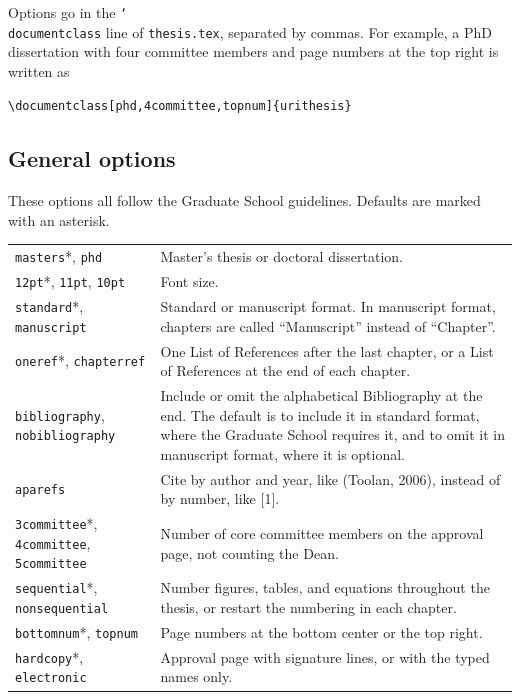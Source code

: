 \documentclass[11pt]{article}
\newcommand\cs[1]{\texttt{\char`\\#1}}
\newcommand\opt[1]{\texttt{#1}}
\newcommand\file[1]{\texttt{#1}}
\begin{document}
Options go in the \cs{documentclass} line of \file{thesis.tex}, separated by
commas.
For example, a PhD dissertation with four committee members and page numbers
at the top right is written as
\begin{verbatim}
\documentclass[phd,4committee,topnum]{urithesis}
\end{verbatim}

\subsection{General options}

These options all follow the Graduate School guidelines.
Defaults are marked with an asterisk.

\medskip
\noindent
\begin{tabularx}{\linewidth}{@{}lX@{}}
\toprule
\opt{masters}*, \opt{phd} & Master's thesis or doctoral dissertation. \\
\opt{12pt}*, \opt{11pt}, \opt{10pt} & Font size. \\
\opt{standard}*, \opt{manuscript} & Standard or manuscript format. In
  manuscript format, chapters are called ``Manuscript'' instead of
  ``Chapter''. \\
\opt{oneref}*, \opt{chapterref} & One List of References after the last
  chapter, or a List of References at the end of each chapter. \\
\opt{bibliography}, \opt{nobibliography} & Include or omit the alphabetical
  Bibliography at the end. The default is to include it in standard format,
  where the Graduate School requires it, and to omit it in manuscript format,
  where it is optional. \\
\opt{aparefs} & Cite by author and year, like (Toolan, 2006), instead of by
  number, like [1]. \\
\opt{3committee}*, \opt{4committee}, \opt{5committee} & Number of core
  committee members on the approval page, not counting the Dean. \\
\opt{sequential}*, \opt{nonsequential} & Number figures, tables, and
  equations throughout the thesis, or restart the numbering in each
  chapter. \\
\opt{bottomnum}*, \opt{topnum} & Page numbers at the bottom center or the top
  right. \\
\opt{hardcopy}*, \opt{electronic} & Approval page with signature lines, or
  with the typed names only. \\
\bottomrule
\end{tabularx}
\end{document}
